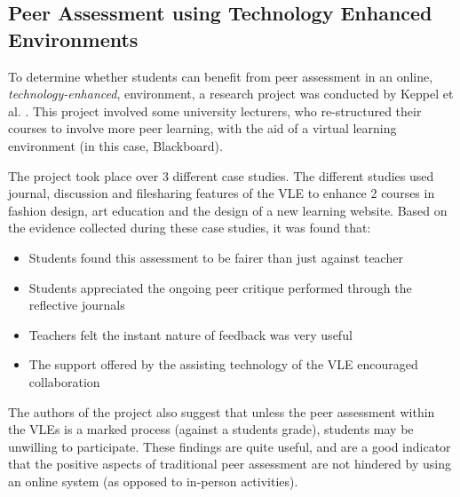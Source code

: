 \documentclass[a4paper,11pt]{report}
\begin{document}
\subsection{Peer Assessment using Technology Enhanced Environments}
To determine whether students can benefit from peer assessment in an online, \textit{technology-enhanced}, environment, a research project was conducted by Keppel et al. \cite{keppell_peer_2006}. This project involved some university lecturers, who re-structured their courses to involve more peer learning, with the aid of a virtual learning environment (in this case, Blackboard).\par
The project took place over 3 different case studies. The different studies used journal, discussion and filesharing features of the VLE to enhance 2 courses in fashion design, art education and the design of a new learning website. Based on the evidence collected during these case studies, it was found that:
\begin{itemize}
 \item Students found this assessment to be fairer than just against teacher
 \item Students appreciated the ongoing peer critique performed through the reflective journals
 \item Teachers felt the instant nature of feedback was very useful
 \item The support offered by the assisting technology of the VLE encouraged collaboration
\end{itemize}
The authors of the project also suggest that unless the peer assessment within the VLEs is a marked process (against a students grade), students may be unwilling to participate. These findings are quite useful, and are a good indicator that the positive aspects of traditional peer assessment are not hindered by using an online system (as opposed to in-person activities).
\end{document}
